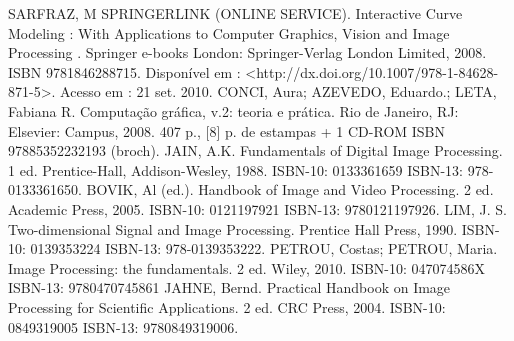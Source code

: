 {SARFRAZ, M SPRINGERLINK (ONLINE SERVICE). Interactive Curve
Modeling : With Applications to Computer Graphics, Vision and Image
Processing . Springer e-books London: Springer-Verlag London Limited, 2008.
ISBN 9781846288715. Disponível em :
<​http://dx.doi.org/10.1007/978-1-84628-871-5​>. Acesso em : 21 set. 2010.
\newline \newline 
CONCI, Aura; AZEVEDO, Eduardo.; LETA, Fabiana R. Computação gráfica,
v.2: teoria e prática. Rio de Janeiro, RJ: Elsevier: Campus, 2008. 407 p., [8] p.
de estampas + 1 CD-ROM ISBN 97885352232193 (broch).
\newline \newline 
JAIN, A.K. Fundamentals of Digital Image Processing. 1 ed. Prentice-Hall,
Addison-Wesley, 1988. ISBN-10: 0133361659 ISBN-13: 978-0133361650.
\newline \newline 
BOVIK, Al (ed.). Handbook of Image and Video Processing. 2 ed. Academic
Press, 2005. ISBN-10: 0121197921 ISBN-13: 9780121197926.
\newline \newline 
LIM, J. S. Two-dimensional Signal and Image Processing. Prentice Hall Press,
1990. ISBN-10: 0139353224 ISBN-13: 978-0139353222.
\newline \newline 
PETROU, Costas; PETROU, Maria. Image Processing: the fundamentals. 2 ed.
Wiley, 2010. ISBN-10: 047074586X ISBN-13: 9780470745861
\newline \newline 
JAHNE, Bernd. Practical Handbook on Image Processing for Scientific
Applications. 2 ed. CRC Press, 2004. ISBN-10: 0849319005 ISBN-13:
9780849319006.
}


